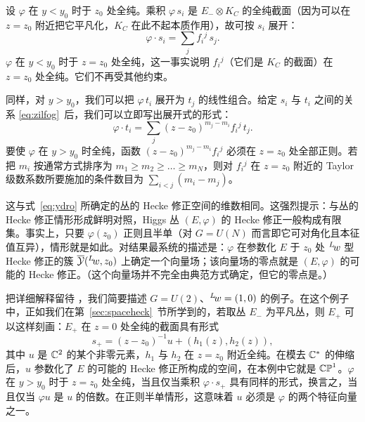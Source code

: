 设 $\varphi$ 在 $y<y_0$ 时于 $z_0$ 处全纯。乘积 $\varphi \,s_i$ 是 $E_- \otimes K_C$ 的全纯截面（因为可以在 $z=z_0$ 附近把它平凡化，$K_C$ 在此不起本质作用），故可按 $s_i$ 展开：
\setcounter{equation}{37}
\begin{equation}\label{eq:bongo}
\varphi\cdot s_i=\sum_j f_i{}^j\,s_j.
\end{equation}
  $\varphi$ 在 $y<y_0$ 时于 $z=z_0$ 处全纯，这一事实说明 $f_i{}^j$（它们是 $K_C$ 的截面）在 $z=z_0$ 处全纯。它们不再受其他约束。

同样，对 $y>y_0$，我们可以把 $\varphi\,t_i$ 展开为 $t_j$ 的线性组合。给定 $s_i$ 与 $t_i$ 之间的关系 \eqref{eq:zilfog}\ 后，我们可以立即写出展开式的形式： %
\setcounter{equation}{38}
\begin{equation}\label{eq:bzongo}
\varphi\cdot t_i=\sum_j
(z-z_0)^{m_j-m_i}f_i{}^j\,t_j.
\end{equation}
 要使 $\varphi$ 在 $y>y_0$ 时全纯，函数 $(z-z_0)^{m_j-m_i}f_i{}^j$ 必须在 $z=z_0$ 处全部正则。若把 $m_i$ 按通常方式排序为 $m_1\geq m_2\geq\dots\geq m_N$，则对 $f_i{}^j$ 在 $z=z_0$ 附近的 Taylor 级数系数所要施加的条件数目为 $\sum_{i<j}(m_i-m_j)$。

这与式~\eqref{eq:ydro} 所确定的丛的 Hecke 修正空间的维数相同。这强烈提示：与丛的 Hecke 修正情形形成鲜明对照，Higgs 丛 $(E,\varphi)$ 的 Hecke 修正一般构成有限集。事实上，只要 $\varphi(z_0)$ 正则且半单（对 $G=U(N)$ 而言即它可对角化且本征值互异），情形就是如此。对结果最系统的描述是：$\varphi$ 在参数化 $E$ 于 $z_0$ 处 $^L\negthinspace w$ 型 Hecke 修正的簇 $\bar {\EUY}({}^L\negthinspace w,z_0)$ 上确定一个向量场；该向量场的零点就是 $(E,\varphi)$ 的可能的 Hecke 修正。（这个向量场并不完全由典范方式确定，但它的零点是。）

把详细解释留待 \cite{ref26}，我们简要描述 $G=U(2)$、$^L\negthinspace w=(1,0)$ 的例子。在这个例子中，正如我们在第~\ref{sec:spaceheck}~节所学到的，若取丛 $E_-$ 为平凡丛，则 $E_+$ 可以这样刻画：$E_+$ 在 $z=0$ 处全纯的截面具有形式 %
\setcounter{equation}{39}
\begin{equation}\label{eq:hxonxno}
s_+=(z-z_0)^{-1}
u+(h_1(z),h_2(z)),
\end{equation}
  其中 $u$ 是 $\Bbb{C}^2$ 的某个非零元素，$h_1$ 与 $h_2$ 在 $z=z_0$ 附近全纯。在模去 $\Bbb{C}^*$ 的伸缩后，$u$ 参数化了 $E$ 的可能的 Hecke 修正所构成的空间，在本例中它就是 $\Bbb{CP}^1$。$\varphi$ 在 $y>y_0$ 时于 $z=z_0$ 处全纯，当且仅当乘积 $\varphi\cdot s_+$ 具有同样的形式，换言之，当且仅当 $\varphi u$ 是 $u$ 的倍数。在正则半单情形，这意味着 $u$ 必须是 $\varphi$ 的两个特征向量之一。

